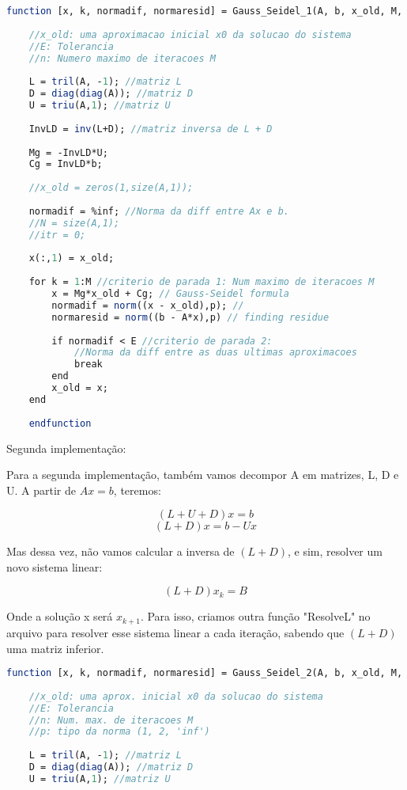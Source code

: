\documentclass[leqno]{article}
\numberwithin{equation}{section}
\begin{document}
\begin{enumerate}
\begin{sol}
	
		\begin{lstlisting}[language=Scilab]
	function [x, k, normadif, normaresid] = Gauss_Seidel_1(A, b, x_old, M, E, p)
				
	//x_old: uma aproximacao inicial x0 da solucao do sistema
	//E: Tolerancia
	//n: Numero maximo de iteracoes M 
				
	L = tril(A, -1); //matriz L
	D = diag(diag(A)); //matriz D
	U = triu(A,1); //matriz U
				
	InvLD = inv(L+D); //matriz inversa de L + D
				
	Mg = -InvLD*U;
	Cg = InvLD*b;
				
	//x_old = zeros(1,size(A,1));
				
	normadif = %inf; //Norma da diff entre Ax e b.
	//N = size(A,1);
	//itr = 0;
				
	x(:,1) = x_old;
				
	for k = 1:M //criterio de parada 1: Num maximo de iteracoes M
		x = Mg*x_old + Cg; // Gauss-Seidel formula
		normadif = norm((x - x_old),p); // 
		normaresid = norm((b - A*x),p) // finding residue
				
		if normadif < E //criterio de parada 2: 
			//Norma da diff entre as duas ultimas aproximacoes
			break
		end
		x_old = x;
	end
				
	endfunction
			\end{lstlisting}
			Segunda implementação:
			
	Para a segunda implementação, também vamos decompor A em matrizes, L, D e U.
	A partir de $Ax = b$, teremos:
	
	$$(L + U + D)x = b$$
	$$(L + D)x = b - Ux$$
	
	Mas dessa vez, não vamos calcular a inversa de $(L + D)$, e sim, resolver um novo sistema linear:
	
	$$(L+D)x_k = B$$
	
	Onde a solução x será $x_{k+1}$. Para isso, criamos outra função "ResolveL" no arquivo para resolver esse sistema linear a cada iteração, sabendo que $(L + D)$ uma matriz inferior.
	
	\begin{lstlisting}[language=Scilab]
	function [x, k, normadif, normaresid] = Gauss_Seidel_2(A, b, x_old, M, E, p)
	
	//x_old: uma aprox. inicial x0 da solucao do sistema
	//E: Tolerancia
	//n: Num. max. de iteracoes M 
	//p: tipo da norma (1, 2, 'inf')
	
	L = tril(A, -1); //matriz L
	D = diag(diag(A)); //matriz D
	U = triu(A,1); //matriz U
	

\end{lstlisting}
\end{sol}
\end{enumerate}
\end{document}
